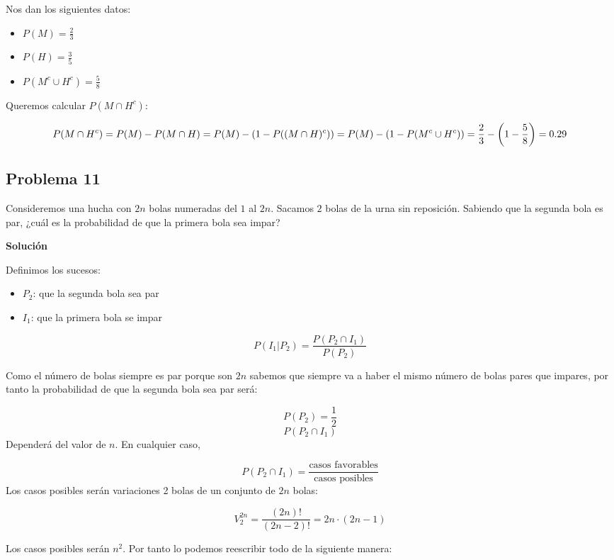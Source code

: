 \documentclass[
]{article}
\providecommand{\tightlist}{%
  \setlength{\itemsep}{0pt}\setlength{\parskip}{0pt}}
\begin{document}
Nos dan los siguientes datos:

\begin{itemize}
\tightlist
\item
  \(P(M) = \frac{2}{3}\)
\item
  \(P(H) = \frac{3}{5}\)
\item
  \(P(M^c \cup H^c) = \frac{5}{8}\)
\end{itemize}

Queremos calcular \(P(M\cap H^c)\):

\[
P(M\cap H^c) = P(M) - P(M \cap H) = \\
P(M) - (1 - P((M \cap H)^c)) = P(M) - (1 - P(M^c \cup H^c)) = \\
\frac{2}{3} - \left(1 - \frac{5}{8} \right) = 0.29
\]

\hypertarget{problema-11}{%
\subsection{Problema 11}\label{problema-11}}

Consideremos una hucha con \(2n\) bolas numeradas del \(1\) al \(2n\).
Sacamos \(2\) bolas de la urna sin reposición. Sabiendo que la segunda
bola es par, ¿cuál es la probabilidad de que la primera bola sea impar?

\textbf{Solución}

Definimos los sucesos:

\begin{itemize}
\tightlist
\item
  \(P_2\): que la segunda bola sea par
\item
  \(I_1\): que la primera bola se impar
\end{itemize}

\[
P(I_1 | P_2) = \frac{P(P_2 \cap I_1)}{P(P_2)}
\]

Como el número de bolas siempre es par porque son \(2n\) sabemos que
siempre va a haber el mismo número de bolas pares que impares, por tanto
la probabilidad de que la segunda bola sea par será:

\[
P(P_2) = \frac{1}{2}
\] \[
P(P_2 \cap I_1)
\] Dependerá del valor de \(n\). En cualquier caso,

\[
P(P_2 \cap I_1) = \frac{\textrm{casos favorables}}{\textrm{casos posibles}}
\] Los casos posibles serán variaciones 2 bolas de un conjunto de \(2n\)
bolas:

\[
V^{2n}_2 = \frac{(2n)!}{(2n - 2)!} = 2n\cdot (2n-1) 
\]

Los casos posibles serán \(n^2\). Por tanto lo podemos reescribir todo
de la siguiente manera:
\end{document}

